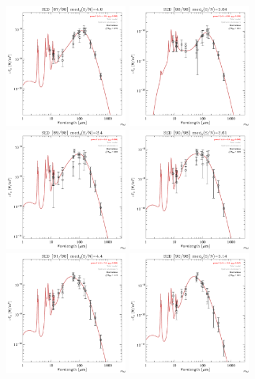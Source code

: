 \documentclass[preprint2,longabstract]{aastex}
\begin{document}
\begin{figure}
    \includegraphics[trim=0 2mm 0 0, clip, width=40mm]{../SEDs/sed_87.pdf}
	\includegraphics[trim=0 2mm 0 0, clip, width=40mm]{../SEDs/sed_88.pdf}
	\includegraphics[trim=0 2mm 0 0, clip, width=40mm]{../SEDs/sed_89.pdf}
	\includegraphics[trim=0 2mm 0 0, clip, width=40mm]{../SEDs/sed_90.pdf}
	\includegraphics[trim=0 2mm 0 0, clip, width=40mm]{../SEDs/sed_91.pdf}
	\includegraphics[trim=0 2mm 0 0, clip, width=40mm]{../SEDs/sed_92.pdf}

\end{figure}
\end{document}
